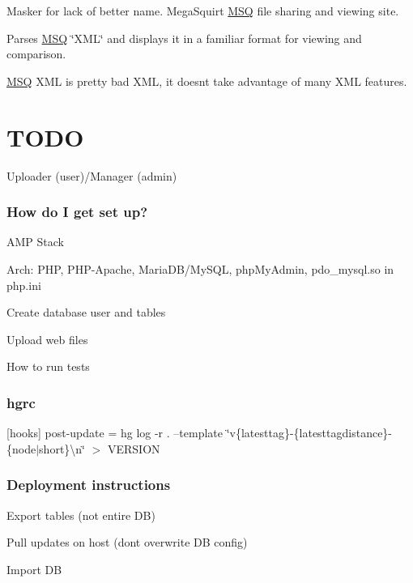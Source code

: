 \textquotesingle{}Masker\textquotesingle{} for lack of better name. Mega\+Squirt \hyperlink{class_m_s_q}{M\+S\+Q} file sharing and viewing site.

Parses \hyperlink{class_m_s_q}{M\+S\+Q} \char`\"{}\+X\+M\+L\char`\"{} and displays it in a familiar format for viewing and comparison.

\hyperlink{class_m_s_q}{M\+S\+Q} X\+M\+L is pretty bad X\+M\+L, it doesn\textquotesingle{}t take advantage of many X\+M\+L features.

\section*{T\+O\+D\+O}

Uploader (user)/\+Manager (admin)

\subsubsection*{How do I get set up?}


\begin{DoxyItemize}
\item A\+M\+P Stack
\item Arch\+: P\+H\+P, P\+H\+P-\/\+Apache, Maria\+D\+B/\+My\+S\+Q\+L, php\+My\+Admin, pdo\+\_\+mysql.\+so in php.\+ini
\item Create database user and tables
\item Upload web files
\item How to run tests
\end{DoxyItemize}

\subsubsection*{hgrc}

\mbox{[}hooks\mbox{]} post-\/update = hg log -\/r . --template \char`\"{}v\{latesttag\}-\/\{latesttagdistance\}-\/\{node$\vert$short\}\textbackslash{}n\char`\"{} $>$ V\+E\+R\+S\+I\+O\+N

\subsubsection*{Deployment instructions}


\begin{DoxyItemize}
\item Export tables (not entire D\+B)
\item Pull updates on host (don\textquotesingle{}t overwrite D\+B config)
\item Import D\+B
\end{DoxyItemize}

